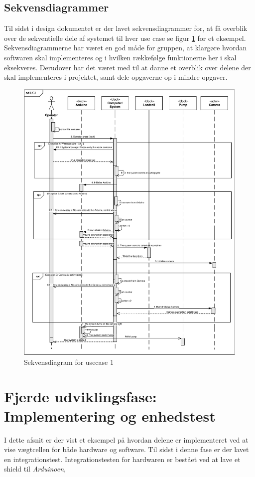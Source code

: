 \subsection{Sekvensdiagrammer}
Til sidst i design dokumentet er der lavet sekvensdiagrammer for, at få overblik over de sekventielle dele af systemet til hver use case se figur \ref{fig:sekvendisgr} for et eksempel. Sekvensdiagrammerne har været en god måde for gruppen, at klargøre hvordan softwaren skal implementeres og i hvilken rækkefølge funktionerne her i skal eksekveres. Derudover har det været med til at danne et overblik over delene der skal implementeres i projektet, samt    dele opgaverne op i mindre opgaver.
\begin{figure}[H]
	\centering
	\includegraphics[width=1\textwidth]{pdf/UC1_cropped.pdf}
	\caption{Sekvensdiagram for usecase 1}
	\label{fig:sekvendisgr}
\end{figure}


\section{Fjerde udviklingsfase: Implementering og enhedstest}
\label{subsec:Implement}
I dette afsnit er der vist et eksempel på hvordan delene er implementeret ved at vise vægtcellen for både hardware og software. Til sidst i denne fase er der lavet en integrationstest. Integrationstesten for hardwaren er bestået ved at lave et shield til \textit{Arduinoen}, 

